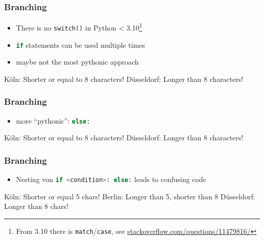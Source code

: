 \documentclass[ngerman]{beamer}
\newcommand{\ta}[1]{\textattachfile[color=1 0 0]{#1}{Code}}
\begin{document}
\begin{frame}[containsverbatim]
\frametitle{Branching}

\begin{itemize}
\item There is no \texttt{switch()} in Python < 3.10\footnote{From 3.10 there is \texttt{match}/\texttt{case}, see \url{stackoverflow.com/questions/11479816/}}
\item \lstinline[language={Python}]{if} statements can be used multiple times
\item maybe not the most pythonic approach
\end{itemize}



\begin{ausgabe}
Köln: Shorter or equal to 8 characters!
Düsseldorf: Longer than 8 characters!
\end{ausgabe}
\end{frame}


\begin{frame}[containsverbatim]
\frametitle{Branching}

\begin{itemize}
\item more \enquote{pythonic}:  \lstinline[language={Python}]{else:}
\end{itemize}



\begin{ausgabe}
Köln: Shorter or equal to 8 characters!
Düsseldorf: Longer than 8 characters!
\end{ausgabe}

\end{frame}

\begin{frame}[containsverbatim]
\frametitle{Branching}

\begin{itemize}
\item Nesting von \lstinline[language={Python}]{if <condition>: else:} leads to confusing code
\end{itemize}



\begin{ausgabe}
Köln: Shorter or equal 5 chars!
Berlin: Longer than 5, shorter than 8
Düsseldorf: Longer than 8 chars!
\end{ausgabe}

\end{frame}
\end{document}
